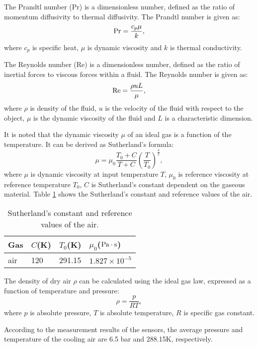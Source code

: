 The Prandtl number (Pr) is a dimensionless number, defined as the ratio of momentum diffusivity to thermal diffusivity.
The Prandtl number is given as:
\[{\rm{Pr}} = \frac{{{c_p}\mu }}{k},\]
where
$c_{p}$ is specific heat, $\mu$ is dynamic viscosity and $k$ is thermal conductivity.

The Reynolds number (Re) is a dimensionless number, defined as the ratio of inertial forces to viscous forces within a fluid.
The Reynolds number is given as:
\[{\rm{Re}} = \frac{{\rho uL}}{\mu },\]
where
$\rho$ is density of the fluid, $u$ is the velocity of the fluid with respect to the object, $\mu$ is the dynamic viscosity of the fluid and $L$ is a characteristic dimension.

It is noted that the dynamic viscosity $\mu$ of an ideal gas is a function of the temperature. It can be derived as Sutherland's formula:
\[\mu  = {\mu _0}\frac{{{T_0} + C}}{{T + C}}{\left( {\frac{T}{{{T_0}}}} \right)^{\frac{3}{2}}},\]
where $\mu$ is dynamic viscosity at input temperature $T$,
$\mu_0$ is reference viscosity at reference temperature $T_0$,
$C$ is Sutherland's constant dependent on the gaseous material.
Table \ref{tab:SutherlandConstant} shows the Sutherland's constant and reference values of the air.
\begin{table}[htbp]
  \centering
  \caption{Sutherland's constant and reference values of the air.}
    \begin{tabular}{p{2cm}p{2cm}p{2cm}p{3cm}}
    \toprule
    Gas   & $C$(K) & $T_0$(K) & $\mu_0$($\rm{Pa\cdot s}$) \\
    \midrule
    air   & 120   & 291.15 & $1.827\times 10^{-5}$ \\
    \bottomrule
    \end{tabular}%
  \label{tab:SutherlandConstant}%
\end{table}%

The density of dry air $\rho$ can be calculated using the ideal gas law, expressed as a function of temperature and pressure:
\begin{equation}
\rho  = \frac{p}{{RT}},
\label{Equ:AirDensity}
\end{equation}
where
$p$ is absolute pressure,
$T$ is absolute temperature,
$R$ is specific gas constant.

According to the measurement results of the sensors, the average pressure and temperature of the cooling air are 6.5 bar and 288.15K, respectively.

